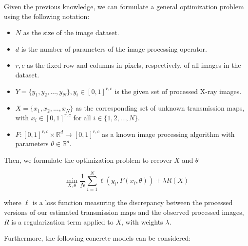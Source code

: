 \documentclass[nomenclature, english, bibtex]{kththesis}
\numberwithin{listing}{chapter}
\begin{document}
Given the previous knowledge, we can formulate a general optimization problem using the following notation:

\begin{itemize}
    \item $N$ as the size of the image dataset.
    \item $d$ is the number of parameters of the image processing operator.
    \item $r, c$ as the fixed row and columns in pixels, respectively, of all images in the dataset.
    \item $Y = \{ y_1, y_2, \dots, y_N \}, y_i \in [0, 1]^{r, c}$ is the given set of processed X-ray images.
    \item $X=\{x_{1}, x_{2}, \dots, x_{N}\} $ as the corresponding set of unknown transmission maps, with $x_i \in [0,1]^{r,c}$ for all $i \in \{1,2,\dots,N\}$. 
    \item $F:[0,1]^{r, c} \times \mathbb{R}^d \to [0, 1]^{r, c}$  as a known image processing algorithm with parameters $\theta \in \mathbb{R}^d$.
\end{itemize}

Then, we formulate the optimization problem to recover $X$ and $\theta$

\begin{equation}
    \min_{X, \theta} \frac{1}{N}\sum_{i=1}^{N} \ell(y_i, F(x_i, \theta)) + \lambda R(X)
\end{equation}

where $\ell$ is a loss function measuring the discrepancy between the processed versions of our estimated transmission
maps and the observed processed images, $R$ is a regularization term applied to $X$, with weights $\lambda$.

Furthermore, the following concrete models can be considered:
\end{document}
